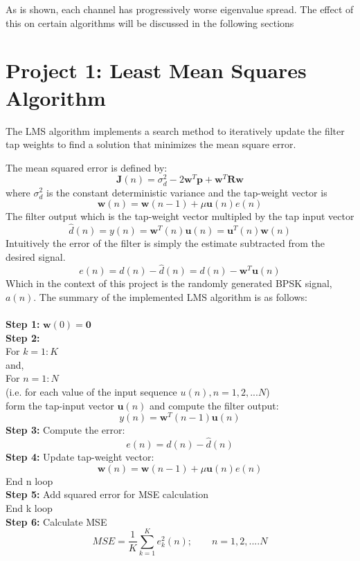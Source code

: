 \documentclass[journal]{IEEEtran}
\begin{document}
As is shown, each channel has progressively worse eigenvalue spread. The effect
of this on certain algorithms will be discussed in the following sections

\section{Project 1: Least Mean Squares Algorithm}
The LMS algorithm implements a search method to iteratively update the
filter tap weights to find a solution that minimizes the mean square error.

The mean squared error is defined by:
$$\boldsymbol{J}(n) = \sigma^2_d - 2\boldsymbol{w}^T\boldsymbol{p} + \boldsymbol{w}^T\boldsymbol{R}\boldsymbol{w}$$ where
$\sigma^2_d$ is the constant deterministic variance and the tap-weight vector is
$$ \boldsymbol{w}(n)= \boldsymbol{w}(n-1)+\mu\boldsymbol{u}(n)e(n)$$
The filter output which is the tap-weight vector multipled by the tap input vector
$$\hat{d}(n) = y(n) = \boldsymbol{w}^T(n)\boldsymbol{u}(n) = \boldsymbol{u}^T(n)\boldsymbol{w}(n)$$
Intuitively the error of the filter is simply the estimate subtracted from the desired signal.
$$e(n) = d(n) - \hat{d}(n) = d(n) - \boldsymbol{w}^T\boldsymbol{u}(n)$$
Which in the context of this project is the randomly generated BPSK signal, $a(n)$. The summary of the implemented LMS algorithm is as follows:\\
\\
\textbf{Step 1:} $\boldsymbol{w}(0) = \boldsymbol{0} $\\
\textbf{Step 2:}\\
For $k = 1:K$\\
and,\\
For $n = 1:N$\\
(i.e. for each value of the input sequence $u(n), n = 1,2,...N$)
\\ \indent form the tap-input vector $\boldsymbol{u}(n)$ and compute the filter output:
\begin{equation}
  y(n) = \boldsymbol{w}^T(n-1)\boldsymbol{u}(n)
\end{equation}
\indent \textbf{Step 3:} Compute the error:
\begin{equation}
  e(n) = d(n) - \hat{d}(n)
\end{equation}
\indent \textbf{Step 4:} Update tap-weight vector:
\begin{equation}
  \boldsymbol{w}(n)= \boldsymbol{w}(n-1)+\mu\boldsymbol{u}(n)e(n)
\end{equation}
End n loop\\
\textbf{Step 5:} Add squared error for MSE calculation\\
End k loop\\
\textbf{Step 6:} Calculate MSE
\begin{equation}
  \label{eq:MSE}
  MSE=\dfrac{1}{K}\sum_{k=1}^{K}e_k^2(n); \qquad n = 1,2,....N
\end{equation}
\end{document}
